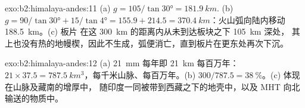\begin{solution}{exo:b2:himalaya-andes:11}
(a) $g = 105/\tan\ang{30} = \qty{181.9}{km}$. (b) $g = 90/\tan\ang{30} + 15/\tan\ang{4} =
155.9 + 214.5 = \qty{370.4}{km}$：火山弧向陆内移动 \qty{188.5}{km}。(c) 板片
在这 \qty{300}{km} 的距离内从未到达板块之下 \qty{105}{km} 深处，
其上也没有热的地幔楔，因此不生成，弧便消亡，直到板片在更东处再次下沉。
\end{solution}

\begin{solution}{exo:b2:himalaya-andes:12}
(a) \qty{21}{mm} 每年即 \qty{21}{km} 每百万年：$21\times37.5 =
\qty{787.5}{km^3}$，每千米山脉、每百万年。(b) $300/787.5 =
\qty{38}{\percent}$。(c) 体现在山脉及藏南的增厚中，
随印度一同被带到西藏之下的地壳中，以及 MHT 向北输送的物质中。
\end{solution}

